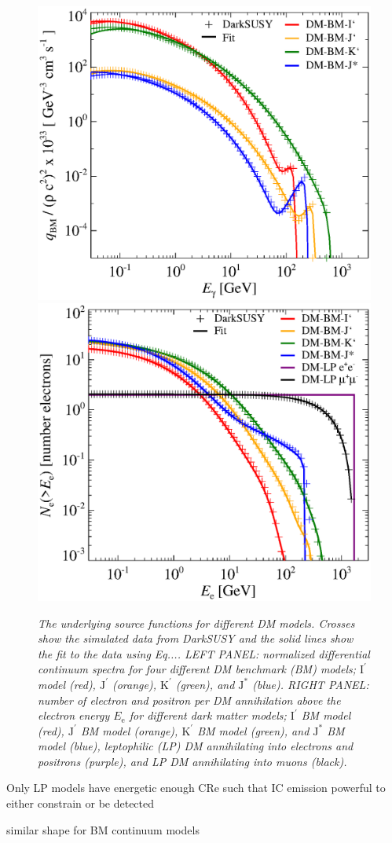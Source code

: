 \documentclass[10pt,aps,pra,reprint,amsmath,amsfonts,amssymb,showpacs]{revtex4-1}
\newcommand{\rmn}{\mathrm}
\newcommand{\ee}{E_\rmn{e}}
\newcommand{\Kp}{\rmn{K}^\prime}
\newcommand{\Ip}{\rmn{I}^\prime}
\newcommand{\Js}{\rmn{J}^*}
\newcommand{\Jp}{\rmn{J}^\prime}
\begin{document}
\begin{figure}
\begin{minipage}{2.0\columnwidth}
 \includegraphics[width=0.49\columnwidth]{figures/fit.ds.flux.eps}
 \includegraphics[width=0.49\columnwidth]{figures/fit.epflux.int.eps}
\caption{\it The underlying source functions for different DM
  models. Crosses show the simulated data from DarkSUSY and the solid
  lines show the fit to the data using Eq.... LEFT PANEL: normalized
  differential continuum spectra for four different DM benchmark (BM)
  models; $\Ip$ model (red), $\Jp$ (orange), $\Kp$ (green), and
  $\Js$ (blue). RIGHT PANEL: number of electron and positron per DM
  annihilation above the electron energy $\ee$ for different dark
  matter models; $\Ip$ BM model (red), $\Jp$ BM model (orange),
  $\Kp$ BM model (green), and $\Js$ BM model (blue), leptophilic (LP)
  DM annihilating into electrons and positrons (purple), and LP DM
  annihilating into muons (black).}
 \label{fig:q_DM}
\end{minipage}
\end{figure}
Only LP models have energetic enough CRe such that IC emission
powerful to either constrain or be detected

similar shape for BM continuum models
\end{document}
